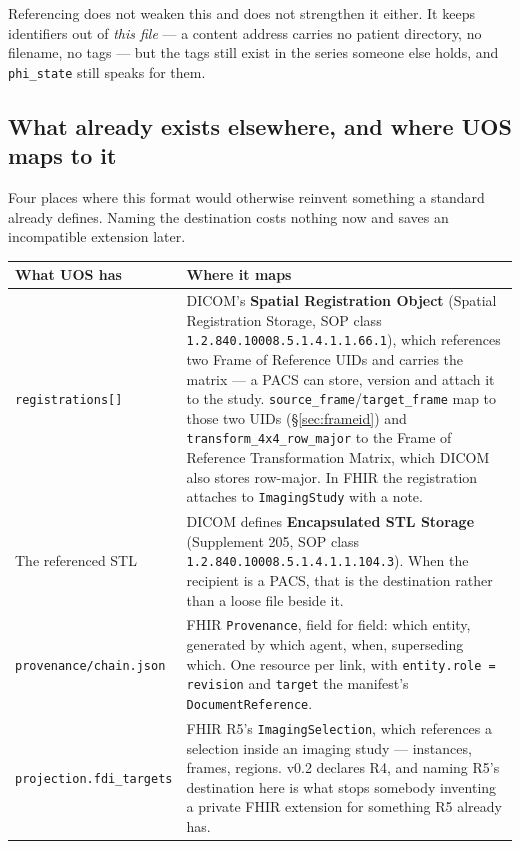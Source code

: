 \documentclass[11pt,a4paper]{article}
\newcommand{\code}[1]{\texttt{\small #1}}
\begin{document}
\vspace{6px}
Referencing does not weaken this and does not strengthen it either. It keeps identifiers out
of \emph{this file} --- a content address carries no patient directory, no filename, no tags
--- but the tags still exist in the series someone else holds, and \code{phi\_state} still
speaks for them.

\subsection{What already exists elsewhere, and where UOS maps to it}\label{sec:mappings}

Four places where this format would otherwise reinvent something a standard already
defines. Naming the destination costs nothing now and saves an incompatible extension
later.

\begin{longtable}{L{4.0cm} L{11.4cm}}
\toprule
\textbf{What UOS has} & \textbf{Where it maps}\\
\midrule
\endhead
\code{registrations[]} & DICOM's \textbf{Spatial Registration Object} (Spatial Registration
Storage, SOP class \code{1.2.840.10008.5.1.4.1.1.66.1}), which references two Frame of
Reference UIDs and carries the matrix --- a PACS can store, version and attach it to the
study. \code{source\_frame}/\code{target\_frame} map to those two UIDs
(\S\ref{sec:frameid}) and \code{transform\_4x4\_row\_major} to the Frame of Reference
Transformation Matrix, which DICOM also stores row-major. In FHIR the registration attaches
to \code{ImagingStudy} with a note.\\
The referenced STL & DICOM defines \textbf{Encapsulated STL Storage} (Supplement 205, SOP
class \code{1.2.840.10008.5.1.4.1.1.104.3}). When the recipient is a PACS, that is the
destination rather than a loose file beside it.\\
\code{provenance/chain.json} & FHIR \code{Provenance}, field for field: which entity,
generated by which agent, when, superseding which. One resource per link, with
\code{entity.role = revision} and \code{target} the manifest's \code{DocumentReference}.\\
\code{projection.fdi\_targets} & FHIR R5's \code{ImagingSelection}, which references a
selection inside an imaging study --- instances, frames, regions. v0.2 declares R4, and
naming R5's destination here is what stops somebody inventing a private FHIR extension for
something R5 already has.\\
\bottomrule
\end{longtable}
\end{document}
